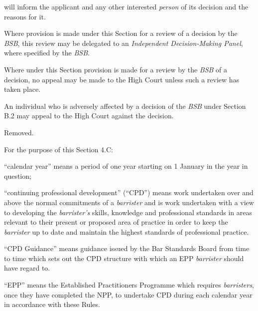  \item will inform the applicant and any other interested \emph{person} of
its decision and the reasons for it.\ln


Where provision is made under this Section for a review of a decision by
the \emph{BSB}, this review may be delegated to an \emph{Independent
Decision-Making Panel}, where specified by the \emph{BSB}.


Where under this Section provision is made for a review by the
\emph{BSB} of a decision, no appeal may be made to the High Court unless
such a review has taken place.


An individual who is adversely affected by a decision of the \emph{BSB}
under Section B.2 may appeal to the High Court against the decision.


Removed.







For the purpose of this Section 4.C:
\nl
\item ``calendar year'' means a period of one year starting on 1 January in
the year in question;

\item ``continuing professional development'' (``CPD'') means work
undertaken over and above the normal commitments of a \emph{barrister}
and is work undertaken with a view to developing the \emph{barrister's}
skills, knowledge and professional standards in areas relevant to their
present or proposed area of practice in order to keep the
\emph{barrister} up to date and maintain the highest standards of
professional practice.

\item ``CPD Guidance'' means guidance issued by the Bar Standards Board
from time to time which sets out the CPD structure with which an EPP
\emph{barrister} should have regard to.

\item ``EPP'' means the Established Practitioners Programme which requires
\emph{barristers}, once they have completed the NPP, to undertake CPD
during each calendar year in accordance with these Rules.

